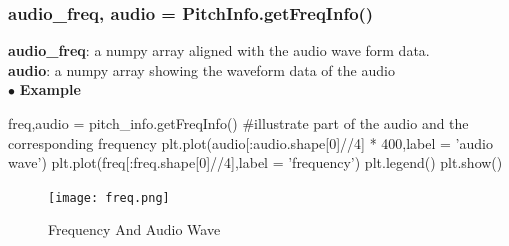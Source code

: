 \documentclass[twoside]{article}
\begin{document}
\subsubsection{audio\_freq, audio = PitchInfo.getFreqInfo()}
\textbf{audio\_freq}: a numpy array aligned with the audio wave form data.\\
\textbf{audio}: a numpy array showing the waveform data of the audio \\

\noindent $\bullet$ \textbf{Example}
\begin{python}
freq,audio = pitch_info.getFreqInfo()
#illustrate part of the audio and the corresponding frequency
plt.plot(audio[:audio.shape[0]//4] * 400,label = 'audio wave')
plt.plot(freq[:freq.shape[0]//4],label = 'frequency')
plt.legend()
plt.show()
\end{python}

\begin{figure}[H]
   \centering
   \texttt{[image: freq.png]}  
   \caption{Frequency And Audio Wave}
\end{figure}
\end{document}
